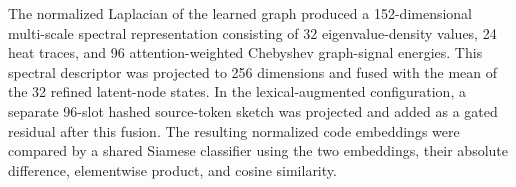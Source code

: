 \documentclass[11pt,a4paper]{article}
\begin{document}
The normalized Laplacian of the learned graph produced a 152-dimensional
multi-scale spectral representation consisting of 32 eigenvalue-density values,
24 heat traces, and 96 attention-weighted Chebyshev graph-signal energies. This
spectral descriptor was projected to 256 dimensions and fused with the mean of
the 32 refined latent-node states. In the lexical-augmented configuration, a
separate 96-slot hashed source-token sketch was projected and added as a gated
residual after this fusion. The resulting normalized code embeddings were
compared by a shared Siamese classifier using the two embeddings, their absolute
difference, elementwise product, and cosine similarity.
\end{document}
